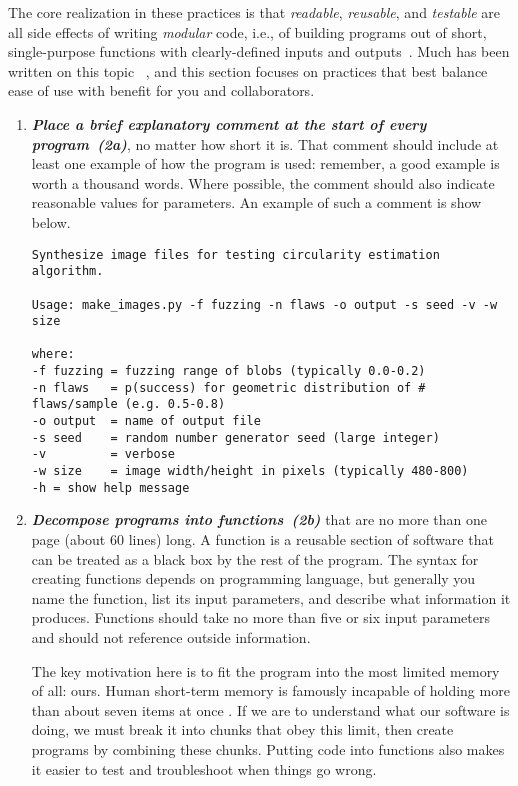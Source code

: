 \documentclass[10pt,letterpaper]{article}
\newcommand{\practice}[2]{\textbf{\emph{{#2}~({#1})}}}
\begin{document}
The core realization in these practices is that \emph{readable},
\emph{reusable}, and \emph{testable} are all side effects of writing
\emph{modular} code, i.e., of building programs out of short,
single-purpose functions with clearly-defined inputs and
outputs~\cite{hunt1999}. Much has been written on this topic
~\cite{hunt1999,mcconnell2004,martin2008},
and this section focuses on practices that best balance ease of use
with benefit for you and collaborators.

\begin{enumerate}

\item

  \practice{2a}{Place a brief explanatory comment at the start of
  every program}, no matter how short it is. That comment should
  include at least one example of how the program is used: remember, a
  good example is worth a thousand words. Where possible, the comment
  should also indicate reasonable values for parameters.  An example
  of such a comment is show below.

{\small
\begin{verbatim}
Synthesize image files for testing circularity estimation algorithm.

Usage: make_images.py -f fuzzing -n flaws -o output -s seed -v -w size

where:
-f fuzzing = fuzzing range of blobs (typically 0.0-0.2)
-n flaws   = p(success) for geometric distribution of # flaws/sample (e.g. 0.5-0.8)
-o output  = name of output file
-s seed    = random number generator seed (large integer)
-v         = verbose
-w size    = image width/height in pixels (typically 480-800)
-h = show help message
\end{verbatim}
}

\item

  \practice{2b}{Decompose programs into functions} that are no more
  than one page (about 60 lines) long. A function is a reusable
  section of software that can be treated as a black box by the rest
  of the program. The syntax for creating functions depends on
  programming language, but generally you name the function, list its
  input parameters, and describe what information it produces.
  Functions should take no more than five or six input parameters and
  should not reference outside information.

  The key motivation here is to fit the program into the most limited
  memory of all: ours. Human short-term memory is famously incapable
  of holding more than about seven items at once \cite{miller1956}. If
  we are to understand what our software is doing, we must break it
  into chunks that obey this limit, then create programs by combining
  these chunks. Putting code into functions also makes it easier to
  test and troubleshoot when things go wrong.


\end{enumerate}
\end{document}
